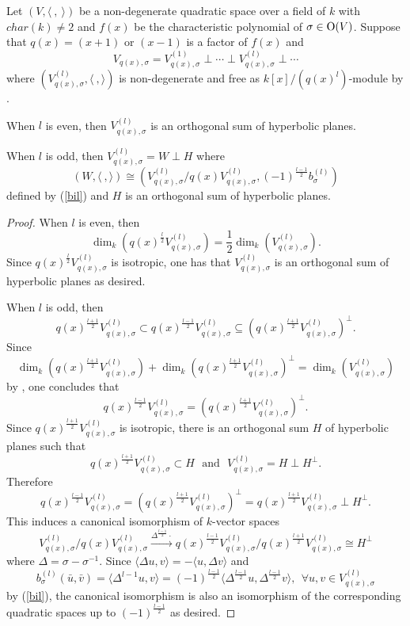 \documentclass[12pt]{amsart}
\begin{document}
\begin{prop} \label{pm 1} Let $(V,  \langle \  , \  \rangle)$ be a non-degenerate quadratic space over a field of $k$ with $char(k)\neq 2$ and $f(x)$ be the characteristic polynomial of $\sigma\in {\rm O}(V)$. Suppose that $q(x)=(x+ 1)$ or $(x-1)$ is a factor of $f(x)$ and 
$$ V_{q(x), \sigma } = V_{q(x), \sigma }^{(1)} \perp \cdots \perp V_{q(x), \sigma }^{(l)} \perp \cdots $$
where  $(V_{q(x), \sigma}^{(l)}, \langle \ , \rangle)$ is non-degenerate and free as $k[x]/(q(x)^l)$-module by \cite[Theorem 3.2]{Mil}.

When $l$ is even, then $V_{q(x), \sigma }^{(l)}$ is an orthogonal sum of hyperbolic planes. 

When $l$ is odd, then $V_{q(x), \sigma }^{(l)}= W\perp H$ where 
$$ (W, \langle \  , \rangle) \cong (V_{q(x), \sigma }^{(l)}/q(x)V_{q(x), \sigma }^{(l)}, (-1)^{\frac{l-1}{2}} b_\sigma^{(l)}) $$ 
defined by (\ref{bil}) and $H$ is an orthogonal sum of hyperbolic planes. 
\end{prop} 

\begin{proof}  When $l$ is even, then
$$\dim_k (q(x)^{\frac{l}{2}} V_{q(x), \sigma }^{(l)})= \frac{1}{2} \dim_k (V_{q(x), \sigma }^{(l)}) . $$ 
Since $q(x)^{\frac{l}{2}} V_{q(x), \sigma }^{(l)}$ is isotropic, one has that $V_{q(x), \sigma }^{(l)}$ is an orthogonal sum of hyperbolic planes as desired. 

When $l$ is odd, then
 $$ q(x)^{\frac{l+1}{2}} V_{q(x), \sigma}^{(l)}  \subset  q(x)^{\frac{l-1}{2}} V_{q(x), \sigma}^{(l)} \subseteq (q(x)^{\frac{l+1}{2}} V_{q(x), \sigma}^{(l)} )^{\perp} .$$ Since 
$$ \dim_k (q(x)^{\frac{l+1}{2}} V_{q(x), \sigma}^{(l)}) + \dim_k (q(x)^{\frac{l+1}{2}} V_{q(x), \sigma}^{(l)} )^{\perp} = \dim_k (V_{q(x), \sigma }^{(l)}) $$
by \cite[42:6]{OM}, one concludes that 
$$q(x)^{\frac{l-1}{2}} V_{q(x), \sigma}^{(l)} = (q(x)^{\frac{l+1}{2}} V_{q(x), \sigma}^{(l)} )^{\perp} .$$ 
Since $q(x)^{\frac{l+1}{2}} V_{q(x), \sigma}^{(l)}$ is isotropic, there is an orthogonal sum $H$ of hyperbolic planes such that 
$$ q(x)^{\frac{l+1}{2}} V_{q(x), \sigma}^{(l)} \subset H \ \ \ \text{and} \ \ \ V_{q(x), \sigma }^{(l)}= H \perp H^{\perp} . $$ 
Therefore 
$$q(x)^{\frac{l-1}{2}} V_{q(x), \sigma}^{(l)} = (q(x)^{\frac{l+1}{2}} V_{q(x), \sigma}^{(l)} )^{\perp} = q(x)^{\frac{l+1}{2}} V_{q(x), \sigma}^{(l)}  \perp H^{\perp} .$$
This induces a canonical isomorphism of $k$-vector spaces
$$ V_{q(x), \sigma}^{(l)}/q(x)V_{q(x), \sigma}^{(l)} \xrightarrow{\Delta^{\frac{l-1}{2}} \cdot }  q(x)^{\frac{l-1}{2}} V_{q(x), \sigma}^{(l)} / q(x)^{\frac{l+1}{2}} V_{q(x), \sigma}^{(l)} \cong H^{\perp}$$ where $\Delta=\sigma -\sigma^{-1}$.  Since $\langle \Delta u, v \rangle = - \langle u, \Delta v \rangle $ and 
$$ b_{\sigma}^{(l)} (\bar u, \bar v)= \langle \Delta^{l-1} u, v \rangle = (-1)^{\frac{l-1}{2}} \langle \Delta^{\frac{l-1}{2}} u ,  \Delta^{\frac{l-1}{2}} v \rangle, \ \ \forall u, v\in V_{q(x), \sigma}^{(l)} $$
 by (\ref{bil}), the canonical isomorphism is also an isomorphism of the corresponding quadratic spaces up to $(-1)^{\frac{l-1}{2}}$ as desired. 
\end{proof} 
\end{document}
